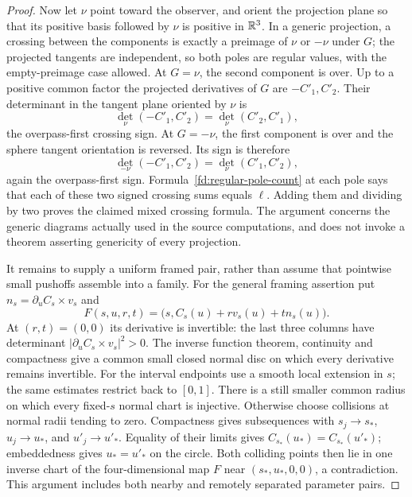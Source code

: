 \begin{proof}
Now let $\nu$ point toward the observer, and orient the projection
plane so that its positive basis followed by $\nu$ is positive in
$\mathbb R^3$. In a generic projection, a crossing between the components
is exactly a preimage of $\nu$ or $-\nu$ under $G$; the projected
tangents are independent, so both poles are regular values, with
the empty-preimage case allowed. At $G=\nu$, the second component
is over. Up to a positive common factor the projected derivatives
of $G$ are $-C'_1,C'_2$. Their determinant in the tangent plane
oriented by $\nu$ is
\begin{equation}
       \det_\nu(-C'_1,C'_2)=\det_\nu(C'_2,C'_1),
\end{equation}
the overpass-first crossing sign. At $G=-\nu$, the first component
is over and the sphere tangent orientation is reversed. Its sign is
therefore
\begin{equation}
       \det_{-\nu}(-C'_1,C'_2)=\det_\nu(C'_1,C'_2),
\end{equation}
again the overpass-first sign. Formula~\eqref{fd:regular-pole-count}
at each pole says that each of these two signed crossing sums equals
$\ell$. Adding them and dividing by two proves the claimed mixed
crossing formula. The argument concerns the generic diagrams actually
used in the source computations, and does not invoke a theorem asserting
genericity of every projection.

It remains to supply a uniform framed pair, rather than assume that
pointwise small pushoffs assemble into a family. For the general
framing assertion put $n_s=\partial_uC_s\times v_s$ and
\begin{equation}\label{fd:family-normal-chart}
 F(s,u,r,t)=\bigl(s,C_s(u)+r v_s(u)+t n_s(u)\bigr).
\end{equation}
At $(r,t)=(0,0)$ its derivative is invertible: the last three
columns have determinant $|\partial_uC_s\times v_s|^2>0$.
The inverse function theorem, continuity and compactness give a
common small closed normal disc on which every derivative remains
invertible. For the interval endpoints use a smooth local extension
in $s$; the same estimates restrict back to $[0,1]$.
There is a still smaller common radius on which every fixed-$s$
normal chart is injective. Otherwise choose collisions at normal
radii tending to zero. Compactness gives subsequences with
$s_j\to s_*$, $u_j\to u_*$, and $u'_j\to u'_*$.
Equality of their limits gives $C_{s_*}(u_*)=C_{s_*}(u'_*)$;
embeddedness gives $u_*=u'_*$ on the circle. Both colliding points
then lie in one inverse chart of the four-dimensional map $F$
near $(s_*,u_*,0,0)$, a contradiction. This argument includes
both nearby and remotely separated parameter pairs.


\end{proof}
